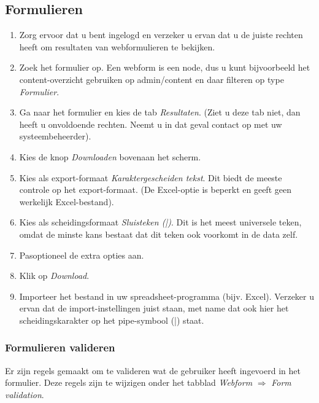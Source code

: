 \subsection{Formulieren} \label{webform}

\begin{enumerate}
\item Zorg ervoor dat u bent ingelogd en verzeker u ervan dat u de juiste rechten heeft om resultaten van webformulieren te bekijken.

\item Zoek het formulier op. Een webform is een node, dus u kunt bijvoorbeeld het content-overzicht gebruiken op admin/content en daar filteren op type \emph{Formulier}.

\item Ga naar het formulier en kies de tab \emph{Resultaten}. (Ziet u deze tab niet, dan heeft u onvoldoende rechten. Neemt u in dat geval contact op met uw systeembeheerder).

\item Kies de knop \emph{Downloaden} bovenaan het scherm.

\item Kies als export-formaat \emph{Karaktergescheiden tekst}. Dit biedt de meeste controle op het export-formaat. (De Excel-optie is beperkt en geeft geen werkelijk Excel-bestand).

\item Kies als scheidingsformaat \emph{Sluisteken (|)}. Dit is het meest universele teken, omdat de minste kans bestaat dat dit teken ook voorkomt in de data zelf.

\item Pasoptioneel de extra opties aan.

\item Klik op \emph{Download}.

\item Importeer het bestand in uw spreadsheet-programma (bijv. Excel). Verzeker u ervan dat de import-instellingen juist staan, met name dat ook hier het scheidingskarakter op het pipe-symbool (|) staat.
\end{enumerate}

\subsubsection{Formulieren valideren}
Er zijn regels gemaakt om te valideren wat de gebruiker heeft ingevoerd in het formulier. Deze regels zijn te wijzigen onder het tabblad \emph{Webform} $\Rightarrow$ \emph{Form validation}.

